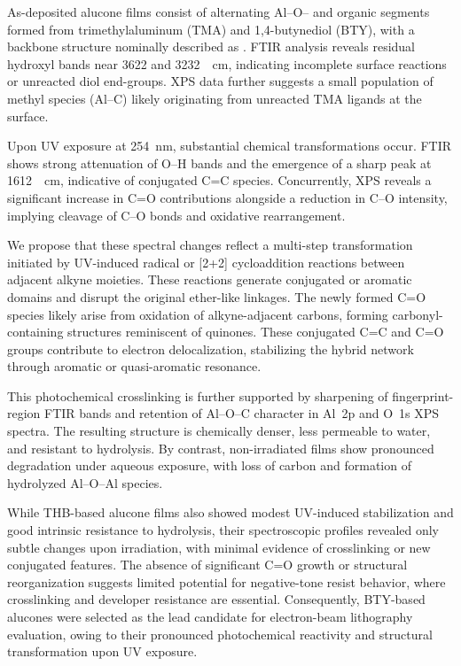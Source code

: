 As-deposited alucone films consist of alternating Al--O-- and organic segments formed from trimethylaluminum (TMA) and 1,4-butynediol (BTY), with a backbone structure nominally described as \ce{[-Al-O-CH2-C#C-CH2-O-]}. FTIR analysis reveals residual hydroxyl bands near 3622 and 3232~\si{\per\centi\meter}, indicating incomplete surface reactions or unreacted diol end-groups. XPS data further suggests a small population of methyl species (Al–C) likely originating from unreacted TMA ligands at the surface.

Upon UV exposure at \SI{254}{\nano\meter}, substantial chemical transformations occur. FTIR shows strong attenuation of O–H bands and the emergence of a sharp peak at \SI{1612}{\per\centi\meter}, indicative of conjugated C=C species. Concurrently, XPS reveals a significant increase in C=O contributions alongside a reduction in C–O intensity, implying cleavage of C–O bonds and oxidative rearrangement.

We propose that these spectral changes reflect a multi-step transformation initiated by UV-induced radical or [2+2] cycloaddition reactions between adjacent alkyne moieties. These reactions generate conjugated or aromatic domains and disrupt the original ether-like linkages. The newly formed C=O species likely arise from oxidation of alkyne-adjacent carbons, forming carbonyl-containing structures reminiscent of quinones. These conjugated C=C and C=O groups contribute to electron delocalization, stabilizing the hybrid network through aromatic or quasi-aromatic resonance.

This photochemical crosslinking is further supported by sharpening of fingerprint-region FTIR bands and retention of Al–O–C character in Al~2p and O~1s XPS spectra. The resulting structure is chemically denser, less permeable to water, and resistant to hydrolysis. By contrast, non-irradiated films show pronounced degradation under aqueous exposure, with loss of carbon and formation of hydrolyzed Al–O–Al species.

While THB-based alucone films also showed modest UV-induced stabilization and good intrinsic resistance to hydrolysis, their spectroscopic profiles revealed only subtle changes upon irradiation, with minimal evidence of crosslinking or new conjugated features. The absence of significant C=O growth or structural reorganization suggests limited potential for negative-tone resist behavior, where crosslinking and developer resistance are essential. Consequently, BTY-based alucones were selected as the lead candidate for electron-beam lithography evaluation, owing to their pronounced photochemical reactivity and structural transformation upon UV exposure.

